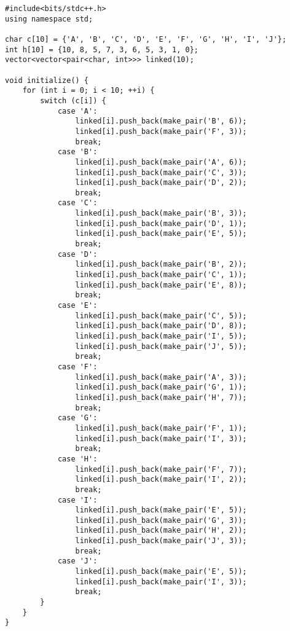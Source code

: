 \documentclass{article}
\begin{document}
\begin{lstlisting}
#include<bits/stdc++.h>
using namespace std;

char c[10] = {'A', 'B', 'C', 'D', 'E', 'F', 'G', 'H', 'I', 'J'};
int h[10] = {10, 8, 5, 7, 3, 6, 5, 3, 1, 0};
vector<vector<pair<char, int>>> linked(10);

void initialize() {
    for (int i = 0; i < 10; ++i) {
        switch (c[i]) {
            case 'A':
                linked[i].push_back(make_pair('B', 6));
                linked[i].push_back(make_pair('F', 3));
                break;
            case 'B':
                linked[i].push_back(make_pair('A', 6));
                linked[i].push_back(make_pair('C', 3));
                linked[i].push_back(make_pair('D', 2));
                break;
            case 'C':
                linked[i].push_back(make_pair('B', 3));
                linked[i].push_back(make_pair('D', 1));
                linked[i].push_back(make_pair('E', 5));
                break;
            case 'D':
                linked[i].push_back(make_pair('B', 2));
                linked[i].push_back(make_pair('C', 1));
                linked[i].push_back(make_pair('E', 8));
                break;
            case 'E':
                linked[i].push_back(make_pair('C', 5));
                linked[i].push_back(make_pair('D', 8));
                linked[i].push_back(make_pair('I', 5));
                linked[i].push_back(make_pair('J', 5));
                break;
            case 'F':
                linked[i].push_back(make_pair('A', 3));
                linked[i].push_back(make_pair('G', 1));
                linked[i].push_back(make_pair('H', 7));
                break;
            case 'G':
                linked[i].push_back(make_pair('F', 1));
                linked[i].push_back(make_pair('I', 3));
                break;
            case 'H':
                linked[i].push_back(make_pair('F', 7));
                linked[i].push_back(make_pair('I', 2));
                break;
            case 'I':
                linked[i].push_back(make_pair('E', 5));
                linked[i].push_back(make_pair('G', 3));
                linked[i].push_back(make_pair('H', 2));
                linked[i].push_back(make_pair('J', 3));
                break;
            case 'J':
                linked[i].push_back(make_pair('E', 5));
                linked[i].push_back(make_pair('I', 3));
                break;
        }
    }
}


\end{lstlisting}
\end{document}
